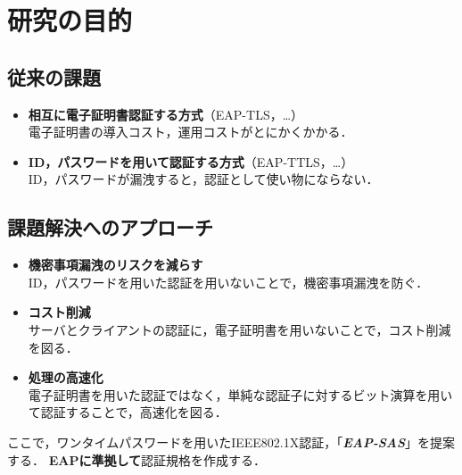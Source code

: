 \section{研究の目的}
\toc
\subsection{従来の課題}
\begin{frame}{\ft}
    \begin{alertblock}{}
        \begin{itemize}
            \setlength{\itemsep}{1em}
            \item \textbf{相互に電子証明書認証する方式}（EAP-TLS，\dots）\\\vspace{.5em}
                  電子証明書の導入コスト，運用コストがとにかくかかる．
            \item \textbf{ID，パスワードを用いて認証する方式}（EAP-TTLS，\dots）\\\vspace{.5em}
                  ID，パスワードが漏洩すると，認証として使い物にならない．
        \end{itemize}
    \end{alertblock}
\end{frame}
\subsection{課題解決へのアプローチ}
\begin{frame}{\ft}
    \begin{exampleblock}{}
        \begin{itemize}
            \setlength{\itemsep}{1em}
            \item \textbf{機密事項漏洩のリスクを減らす}\\
                  ID，パスワードを用いた認証を用いないことで，機密事項漏洩を防ぐ．
            \item \textbf{コスト削減}\\
                  サーバとクライアントの認証に，電子証明書を用いないことで，コスト削減を図る．
            \item \textbf{処理の高速化}\\
                  電子証明書を用いた認証ではなく，単純な認証子に対するビット演算を用いて認証することで，高速化を図る．
        \end{itemize}
    \end{exampleblock}
    ここで，ワンタイムパスワードを用いたIEEE802.1X認証，「\textit{\bfseries EAP-SAS}」を提案する．
    \textbf{\color{red}EAPに準拠して}認証規格を作成する．
\end{frame}